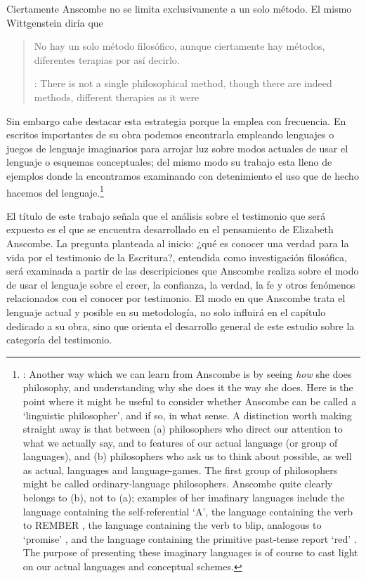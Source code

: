 Ciertamente Anscombe no se limita exclusivamente a un solo método. El mismo Wittgenstein diría que \blockquote[{\cite[\S133]{wittgenstein1953phiinv}}: There is not a single philosophical method, though there are indeed methods, different therapies as it were]{No hay un solo método filosófico, aunque ciertamente hay métodos, diferentes terapias por así decirlo.}

Sin embargo cabe destacar esta estrategia porque la emplea con frecuencia. En escritos importantes de su obra podemos encontrarla empleando lenguajes o juegos de lenguaje imaginarios para arrojar luz sobre modos actuales de usar el lenguaje o esquemas conceptuales; del mismo modo su trabajo esta lleno de ejemplos donde la encontramos examinando con detenimiento el uso que de hecho hacemos del lenguaje.\footnote{\cite[Cf.~][228--229]{teichmann2008ans}: Another way which we can learn from Anscombe is by seeing \emph{how} she does philosophy, and understanding why she does it the way she does. Here is the point where it might be useful to consider whether Anscombe can be called a `linguistic philosopher', and if so, in what sense. A distinction worth making straight away is that between (a) philosophers who direct our attention to what we actually say, and to features of our actual language (or group of languages), and (b) philosophers who ask us to think about possible, as well as actual, languages and language-games. The first group of philosophers might be called ordinary-language philosophers. Anscombe quite clearly belongs to (b), not to (a); examples of her imafinary languages include the language containing the self-referential `A', the language containing the verb to REMBER \textelp{}, the language containing the verb to blip, analogous to `promise' \textelp{}, and the language containing the primitive past-tense report `red' \textelp{}. The purpose of presenting these imaginary languages is of course to cast light on our actual languages and conceptual schemes.}

El título de este trabajo señala que el análisis sobre el testimonio que será expuesto es el que se encuentra desarrollado en el pensamiento de Elizabeth Anscombe. La pregunta planteada al inicio: ¿qué es conocer una verdad para la vida por el testimonio de la Escritura?, entendida como investigación filosófica, será examinada a partir de las descripiciones que Anscombe realiza sobre el modo de usar el lenguaje sobre el creer, la confianza, la verdad, la fe y otros fenómenos relacionados con el conocer por testimonio. El modo en que Anscombe trata el lenguaje actual y posible en su metodología, no solo influirá en el capítulo dedicado a su obra, sino que orienta el desarrollo general de este estudio sobre la categoría del testimonio.

